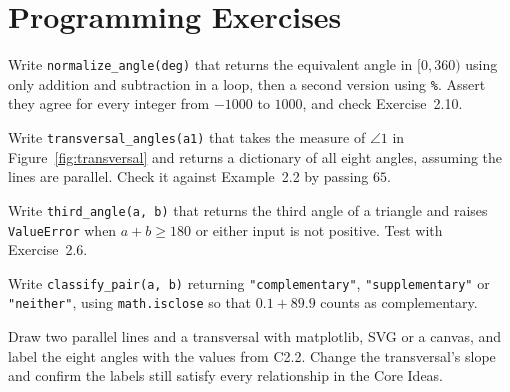 \section{Programming Exercises}

\begin{codeexercises}
\item Write \lstinline!normalize_angle(deg)! that returns the equivalent angle in $[0, 360)$ using only addition and subtraction in a loop, then a second version using \lstinline!%!. Assert they agree for every integer from $-1000$ to $1000$, and check Exercise~2.10.
\item Write \lstinline!transversal_angles(a1)! that takes the measure of $\angle 1$ in Figure~\ref{fig:transversal} and returns a dictionary of all eight angles, assuming the lines are parallel. Check it against Example~2.2 by passing $65$.
\item Write \lstinline!third_angle(a, b)! that returns the third angle of a triangle and raises \lstinline!ValueError! when $a + b \ge 180$ or either input is not positive. Test with Exercise~2.6.
\item Write \lstinline!classify_pair(a, b)! returning \lstinline!"complementary"!, \lstinline!"supplementary"! or \lstinline!"neither"!, using \lstinline!math.isclose! so that $0.1 + 89.9$ counts as complementary.
\item Draw two parallel lines and a transversal with matplotlib, SVG or a canvas, and label the eight angles with the values from C2.2. Change the transversal's slope and confirm the labels still satisfy every relationship in the Core Ideas.
\end{codeexercises}
